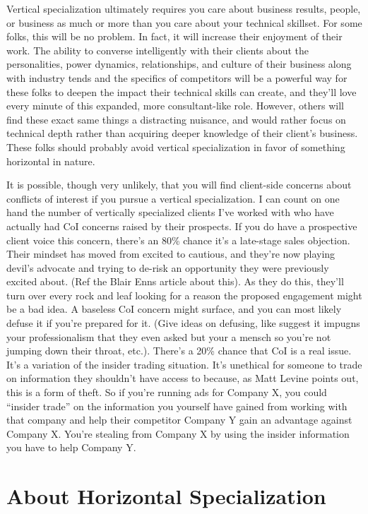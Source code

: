 Vertical specialization ultimately requires you care about business results, people, or business as much or more than you care about your technical skillset. For some folks, this will be no problem. In fact, it will increase their enjoyment of their work. The ability to converse intelligently with their clients about the personalities, power dynamics, relationships, and culture of their business along with industry tends and the specifics of competitors will be a powerful way for these folks to deepen the impact their technical skills can create, and they'll love every minute of this expanded, more consultant-like role. However, others will find these exact same things a distracting nuisance, and would rather focus on technical depth rather than acquiring deeper knowledge of their client's business. These folks should probably avoid vertical specialization in favor of something horizontal in nature.

It is possible, though very unlikely, that you will find client-side concerns about conflicts of interest if you pursue a vertical specialization. I can count on one hand the number of vertically specialized clients I've worked with who have actually had CoI concerns raised by their prospects. If you do have a prospective client voice this concern, there's an 80\% chance it's a late-stage sales objection. Their mindset has moved from excited to cautious, and they're now playing devil's advocate and trying to de-risk an opportunity they were previously excited about. (Ref the Blair Enns article about this). As they do this, they'll turn over every rock and leaf looking for a reason the proposed engagement might be a bad idea. A baseless CoI concern might surface, and you can most likely defuse it if you're prepared for it. (Give ideas on defusing, like suggest it impugns your professionalism that they even asked but your a mensch so you're not jumping down their throat, etc.). There's a 20\% chance that CoI is a real issue. It's a variation of the insider trading situation. It's unethical for someone to trade on information they shouldn't have access to because, as Matt Levine points out, this is a form of theft. So if you're running ads for Company X, you could ``insider trade'' on the information you yourself have gained from working with that company and help their competitor Company Y gain an advantage against Company X. You're stealing from Company X by using the insider information you have to help Company Y.

\section{About Horizontal Specialization}

